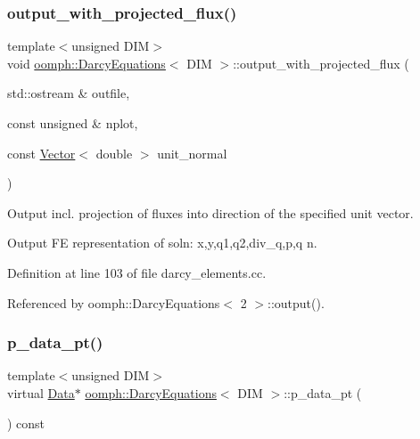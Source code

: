 \subsubsection{\texorpdfstring{output\+\_\+with\+\_\+projected\+\_\+flux()}{output\_with\_projected\_flux()}}
{\footnotesize\ttfamily template$<$unsigned D\+IM$>$ \\
void \hyperlink{classoomph_1_1DarcyEquations}{oomph\+::\+Darcy\+Equations}$<$ D\+IM $>$\+::output\+\_\+with\+\_\+projected\+\_\+flux (\begin{DoxyParamCaption}\item[{std\+::ostream \&}]{outfile,  }\item[{const unsigned \&}]{nplot,  }\item[{const \hyperlink{classoomph_1_1Vector}{Vector}$<$ double $>$}]{unit\+\_\+normal }\end{DoxyParamCaption})}



Output incl. projection of fluxes into direction of the specified unit vector. 

Output FE representation of soln\+: x,y,q1,q2,div\+\_\+q,p,q  n. 

Definition at line 103 of file darcy\+\_\+elements.\+cc.



Referenced by oomph\+::\+Darcy\+Equations$<$ 2 $>$\+::output().

\mbox{\label{classoomph_1_1DarcyEquations_adf8414eb7fe79be0adf62d26e1b361fb}} 
\subsubsection{\texorpdfstring{p\+\_\+data\+\_\+pt()}{p\_data\_pt()}}
{\footnotesize\ttfamily template$<$unsigned D\+IM$>$ \\
virtual \hyperlink{classoomph_1_1Data}{Data}$\ast$ \hyperlink{classoomph_1_1DarcyEquations}{oomph\+::\+Darcy\+Equations}$<$ D\+IM $>$\+::p\+\_\+data\+\_\+pt (\begin{DoxyParamCaption}{ }\end{DoxyParamCaption}) const\hspace{0.3cm}{\ttfamily [pure virtual]}}



